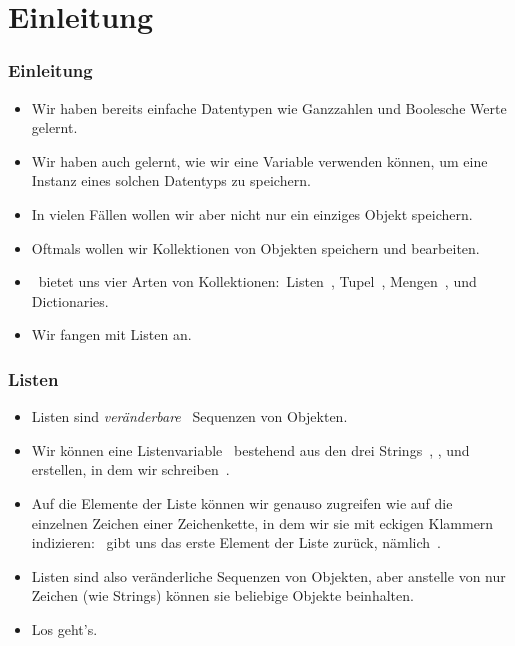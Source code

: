 \documentclass[aspectratio=169,mathserif,notheorems]{beamer}%
\subtitle{17.~Listen}%
\begin{document}
%
%
\startPresentation%
%
\section{Einleitung}%
\begin{frame}%
\frametitle{Einleitung}%
\begin{itemize}%
\item Wir haben bereits einfache Datentypen wie Ganzzahlen und Boolesche Werte gelernt.%
%
\item<2-> Wir haben auch gelernt, wie wir eine Variable verwenden können, um eine Instanz eines solchen Datentyps zu speichern.%
%
\item<3-> In vielen Fällen wollen wir aber nicht nur ein einziges Objekt speichern.%
%
\item<4-> Oftmals wollen wir Kollektionen von Objekten speichern und bearbeiten\cite{PSF:P3D:TPSL:BIT,PSF:P3D:TPLR:DM,PSF:P3D:TPSL:CAABCFC}.%
%
\item<5-> \python\ bietet uns vier Arten von Kollektionen:~Listen~, Tupel~, Mengen~, und Dictionaries.%
%
\item<6-> Wir fangen mit Listen an.%
%
\end{itemize}%
\end{frame}%
%
\begin{frame}%
\frametitle{Listen}%
\begin{itemize}%
\item Listen sind \emph{veränderbare}~ Sequenzen von Objekten.%
\item<2-> Wir können eine Listenvariable~ bestehend aus den drei Strings~, , und~ erstellen, in dem wir schreiben~.%
\item<3-> Auf die Elemente der Liste können wir genauso zugreifen wie auf die einzelnen Zeichen einer Zeichenkette, in dem wir sie mit eckigen Klammern indizieren\cite{PSF:P3D:TPLR:S}:~ gibt uns das erste Element der Liste zurück, nämlich~.
\item<4-> Listen sind also veränderliche Sequenzen von Objekten, aber anstelle von nur Zeichen (wie Strings) können sie beliebige Objekte beinhalten.%
\item<5-> Los geht's.%
\end{itemize}%
\end{frame}%
%
\end{document}
